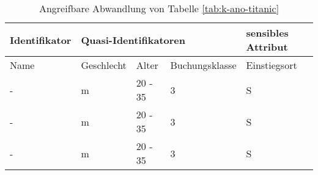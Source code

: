 \begin{table}[!htb]
\centering
\begin{tabular}{|l|lll|l|}
\hline
\rowcolor[HTML]{CBCEFB} 
Identifikator & \multicolumn{3}{l|}{\cellcolor[HTML]{CBCEFB}Quasi-Identifikatoren}                                                            & sensibles Attribut \\ \hline
\rowcolor[HTML]{EFEFEF} 
Name          & \multicolumn{1}{l|}{\cellcolor[HTML]{EFEFEF}Geschlecht} & \multicolumn{1}{l|}{\cellcolor[HTML]{EFEFEF}Alter} & Buchungsklasse & Einstiegsort       \\ \hline
-             & \multicolumn{1}{l|}{m}                                  & \multicolumn{1}{l|}{20 - 35}                       & 3              & S                  \\ \hline
-             & \multicolumn{1}{l|}{m}                                  & \multicolumn{1}{l|}{20 - 35}                       & 3              & S                  \\ \hline
-             & \multicolumn{1}{l|}{m}                                  & \multicolumn{1}{l|}{20 - 35}                       & 3              & S                  \\ \hline
\end{tabular}
\caption{Angreifbare Abwandlung von Tabelle \ref{tab:k-ano-titanic}}
\label{tab:homo_k_ano}
\end{table}